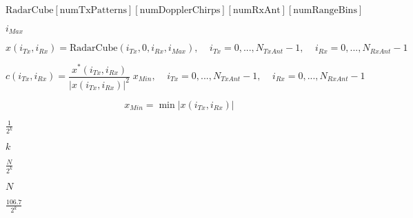 \documentclass{article}
\begin{document}
\[ \mbox{RadarCube}[\mbox{numTxPatterns}][\mbox{numDopplerChirps}][\mbox{numRxAnt}][\mbox{numRangeBins}] \]
\pagebreak

$i_{Max}$
\pagebreak

\[ x(i_{Tx},i_{Rx}) = \mbox{RadarCube}(i_{Tx},0,i_{Rx},i_{Max}), \;\;\;\; i_{Tx}=0,...,N_{TxAnt}-1, \;\;\;\; i_{Rx}=0,...,N_{RxAnt}-1 \]
\pagebreak

\[ c(i_{Tx},i_{Rx}) = \frac{x^*(i_{Tx},i_{Rx})}{|x(i_{Tx},i_{Rx})|^2}\;x_{Min}, \;\;\;\; i_{Tx}=0,...,N_{TxAnt}-1, \;\;\;\; i_{Rx}=0,...,N_{RxAnt}-1 \]
\pagebreak

\[ x_{Min} = \min{|x(i_{Tx},i_{Rx})|} \]
\pagebreak

$\frac{1}{2^k}$
\pagebreak

$k$
\pagebreak

$\frac{N}{2^k}$
\pagebreak

$N$
\pagebreak

$\frac{106.7}{2^k}$
\pagebreak
\end{document}
